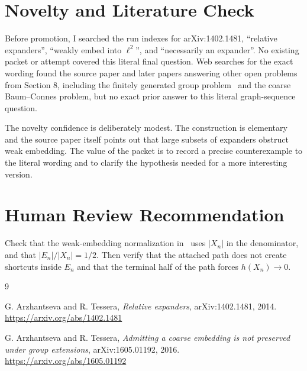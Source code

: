 \documentclass[11pt]{article}
\begin{document}
\section*{Novelty and Literature Check}

Before promotion, I searched the run indexes for arXiv:1402.1481, ``relative
expanders'', ``weakly embed into \(\ell^2\)'', and ``necessarily an
expander''.  No existing packet or attempt covered this literal final
question.  Web searches for the exact wording found the source paper and later
papers answering other open problems from Section 8, including the finitely
generated group problem~\cite{AT2} and the coarse Baum--Connes problem, but no
exact prior answer to this literal graph-sequence question.

The novelty confidence is deliberately modest.  The construction is elementary
and the source paper itself points out that large subsets of expanders obstruct
weak embedding.  The value of the packet is to record a precise counterexample
to the literal wording and to clarify the hypothesis needed for a more
interesting version.

\section*{Human Review Recommendation}

Check that the weak-embedding normalization in~\cite{AT} uses \(|X_n|\) in the
denominator, and that \(|E_n|/|X_n|=1/2\).  Then verify that the attached path
does not create shortcuts inside \(E_n\) and that the terminal half of the path
forces \(h(X_n)\to 0\).

\begin{thebibliography}{9}

G. Arzhantseva and R. Tessera,
\emph{Relative expanders},
arXiv:1402.1481, 2014.
\url{https://arxiv.org/abs/1402.1481}

G. Arzhantseva and R. Tessera,
\emph{Admitting a coarse embedding is not preserved under group extensions},
arXiv:1605.01192, 2016.
\url{https://arxiv.org/abs/1605.01192}

\end{thebibliography}
\end{document}
